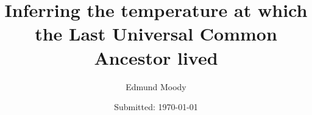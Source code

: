 
  \title{\vspace{-15mm}\fontsize{21pt}{10pt}\selectfont\textbf{Inferring the temperature at which the Last Universal Common Ancestor lived}}

  \author[1]{\large Edmund Moody}
  \renewcommand\Authands{ and }

	\date{Submitted: \usvardate\today}